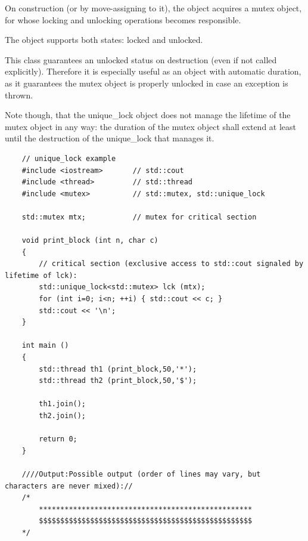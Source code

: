 \documentclass[UTF8,a4paper,12pt]{ctexbook}
\begin{document}
\begin{enumerate}[itemindent = 1em]
					On construction (or by move-assigning to it), the object acquires a mutex object, for whose locking and unlocking operations becomes responsible.
					
					The object supports both states: locked and unlocked.
					
					This class guarantees an unlocked status on destruction (even if not called explicitly). Therefore it is especially useful as an object with automatic duration, as it guarantees the mutex object is properly unlocked in case an exception is thrown.
					
					Note though, that the unique\_lock object does not manage the lifetime of the mutex object in any way: the duration of the mutex object shall extend at least until the destruction of the unique\_lock that manages it.
\begin{lstlisting}
	// unique_lock example
	#include <iostream>       // std::cout
	#include <thread>         // std::thread
	#include <mutex>          // std::mutex, std::unique_lock
	
	std::mutex mtx;           // mutex for critical section
	
	void print_block (int n, char c) 
	{
		// critical section (exclusive access to std::cout signaled by lifetime of lck):
		std::unique_lock<std::mutex> lck (mtx);
		for (int i=0; i<n; ++i) { std::cout << c; }
		std::cout << '\n';
	}
	
	int main ()
	{
		std::thread th1 (print_block,50,'*');
		std::thread th2 (print_block,50,'$');
		
		th1.join();
		th2.join();
		
		return 0;
	}
	
	////Output:Possible output (order of lines may vary, but characters are never mixed)://
	/*
		**************************************************
		$$$$$$$$$$$$$$$$$$$$$$$$$$$$$$$$$$$$$$$$$$$$$$$$$$
	*/
\end{lstlisting}
			\end{enumerate}
\end{document}
